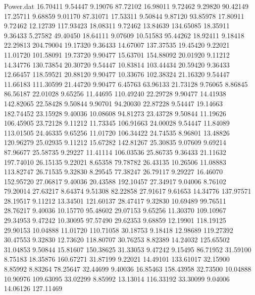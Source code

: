 \begin{filecontents}{Power.dat}
  16.70411    9.54447    9.19076   87.72102
  16.98011    9.72462    9.29820   90.42149
  17.25711    9.68859    9.01170   87.31071
  17.53311    9.50844    9.87120   93.85978
  17.80911    9.72462   12.12739  117.93423
  18.08311    9.72462   13.84639  134.65085
  18.35911    9.36433    5.27582   49.40450
  18.64111    9.07609   10.51583   95.44262
  18.92411    9.18418   22.29813  204.79004
  19.17320    9.36433   14.67007  137.37535
  19.45420    9.22021   11.01720  101.58091
  19.73720    9.90477   15.63701  154.88092
  20.01920    9.11212   14.34776  130.73854
  20.30720    9.54447   10.83814  103.44434
  20.59420    9.36433   12.66457  118.59521
  20.88120    9.90477   10.33676  102.38324
  21.16320    9.54447   11.66183  111.30599
  21.44720    9.90477    6.45763   63.96133
  21.73128    9.76065    8.86845   86.56187
  22.01028    9.65256   11.44695  110.49240
  22.29728    9.90477   14.41938  142.82065
  22.58428    9.50844    9.90701   94.20030
  22.87228    9.54447   19.14663  182.74452
  23.15928    9.40036   10.08608   94.81273
  23.43728    9.50844   11.19626  106.45905
  23.72128    9.11212   11.73345  106.91663
  24.00028    9.54447   11.84089  113.01505
  24.46335    9.65256   11.01720  106.34422
  24.74535    8.96801   13.48826  120.96279
  25.02935    9.11212   15.67282  142.81267
  25.30835    9.07609    9.69214   87.96677
  25.58735    9.29227   11.41114  106.03536
  25.86735    9.36433   21.11632  197.74010
  26.15135    9.22021    8.65358   79.78782
  26.43135   10.26506   11.08883  113.82747
  26.71535    9.32830    8.29545   77.38247
  26.79117    9.29227   16.46070  152.95720
  27.06817    9.40036   20.43588  192.10457
  27.34917    9.04006    8.76102   79.20014
  27.63217    8.64374    9.51308   82.22858
  27.91617    9.61653   14.34776  137.97571
  28.19517    9.11212   13.34501  121.60137
  28.47417    9.32830   10.69489   99.76511
  28.76217    9.40036   10.15770   95.48602
  29.07153    9.65256   11.30370  109.10967
  29.34953    9.47242   10.30095   97.57490
  29.62353    9.68859   12.19901  118.19125
  29.90153   10.04888   11.01720  110.71058
  30.18753    9.18418   12.98689  119.27392
  30.47553    9.32830   12.73620  118.80707
  30.76253    8.82389   14.24032  125.65502
  31.04853    9.50844   15.81607  150.38625
  31.33053    9.47242    9.15495   86.71952
  31.59100    8.75183   18.35876  160.67271
  31.87199    9.22021   14.49101  133.61017
  32.15900    8.85992    8.83264   78.25647
  32.44699    9.40036   16.85463  158.43958
  32.73500   10.04888   10.90976  109.63095
  33.02299    8.85992   13.13014  116.33192
  33.30099    9.04006   14.06126  127.11469

\end{filecontents}

